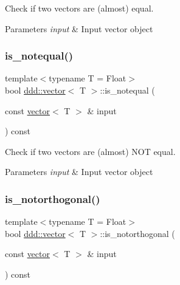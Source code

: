 Check if two vectors are (almost) equal. 


\begin{DoxyParams}{Parameters}
{\em input} & Input vector object \\
\hline
\end{DoxyParams}
\mbox{\label{classddd_1_1vector_a73bf080395fbbdf9642cf5440d699013}} 
\subsubsection{\texorpdfstring{is\+\_\+notequal()}{is\_notequal()}}
{\footnotesize\ttfamily template$<$typename T = Float$>$ \\
bool \hyperlink{classddd_1_1vector}{ddd\+::vector}$<$ T $>$\+::is\+\_\+notequal (\begin{DoxyParamCaption}\item[{const \hyperlink{classddd_1_1vector}{vector}$<$ T $>$ \&}]{input }\end{DoxyParamCaption}) const\hspace{0.3cm}{\ttfamily [inline]}}



Check if two vectors are (almost) N\+OT equal. 


\begin{DoxyParams}{Parameters}
{\em input} & Input vector object \\
\hline
\end{DoxyParams}
\mbox{\label{classddd_1_1vector_ab08843c258a0e50ff940ece9c03ad774}} 
\subsubsection{\texorpdfstring{is\+\_\+notorthogonal()}{is\_notorthogonal()}}
{\footnotesize\ttfamily template$<$typename T = Float$>$ \\
bool \hyperlink{classddd_1_1vector}{ddd\+::vector}$<$ T $>$\+::is\+\_\+notorthogonal (\begin{DoxyParamCaption}\item[{const \hyperlink{classddd_1_1vector}{vector}$<$ T $>$ \&}]{input }\end{DoxyParamCaption}) const\hspace{0.3cm}{\ttfamily [inline]}}



